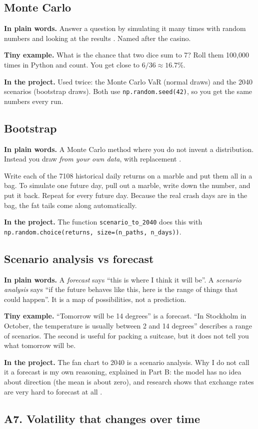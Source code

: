 \documentclass[11pt,a4paper]{article}
\newcommand{\term}[1]{\subsection{#1}}
\newcommand{\plain}{\textbf{In plain words.} }
\newcommand{\inproj}{\textbf{In the project.} }
\newcommand{\tinyex}{\textbf{Tiny example.} }
\newcommand{\code}[1]{\texttt{#1}}
\begin{document}
\term{Monte Carlo}\label{g:mc}
\plain Answer a question by simulating it many times with random numbers
and looking at the results \citep{glasserman2003}. Named after the casino.

\tinyex What is the chance that two dice sum to 7? Roll them 100{,}000 times
in Python and count. You get close to $6/36 \approx 16.7\%$.

\inproj Used twice: the Monte Carlo VaR (normal draws) and the 2040
scenarios (bootstrap draws). Both use \code{np.random.seed(42)}, so you get
the same numbers every run.

\term{Bootstrap}\label{g:bootstrap}
\plain A Monte Carlo method where you do not invent a distribution. Instead
you draw \emph{from your own data}, with replacement \citep{efron1979,
efrontibshirani1986}.

\begin{example}
Write each of the 7108 historical daily returns on a marble and put them all
in a bag. To simulate one future day, pull out a marble, write down the
number, and put it back. Repeat for every future day. Because the real
crash days are in the bag, the fat tails come along automatically.
\end{example}

\inproj The function \code{scenario\_to\_2040} does this with
\code{np.random.choice(returns, size=(n\_paths, n\_days))}.

\term{Scenario analysis vs forecast}\label{g:scenario}
\plain A \emph{forecast} says ``this is where I think it will be''. A
\emph{scenario analysis} says ``if the future behaves like this, here is the
range of things that could happen''. It is a map of possibilities, not a
prediction.

\tinyex ``Tomorrow will be 14 degrees'' is a forecast. ``In Stockholm in
October, the temperature is usually between 2 and 14 degrees'' describes a
range of scenarios. The second is useful for packing a suitcase, but it
does not tell you what tomorrow will be.

\inproj The fan chart to 2040 is a scenario analysis. Why I do not call it
a forecast is my own reasoning, explained in Part B: the model has no idea
about direction (the mean is about zero), and research shows that exchange
rates are very hard to forecast at all \citep{meese1983,rossi2013}.

\subsection*{A7. Volatility that changes over time}
\end{document}
